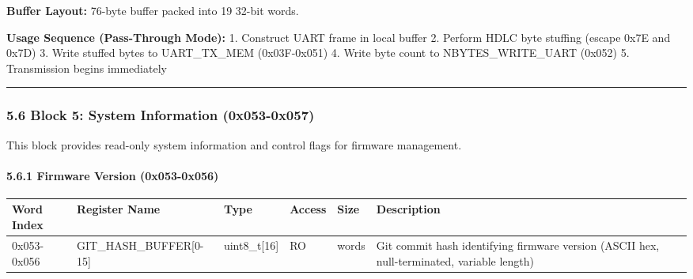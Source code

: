 \documentclass[
  11pt,
]{article}
\newcounter{none} %
\begin{document}
\textbf{Buffer Layout:} 76-byte buffer packed into 19 32-bit words.

\textbf{Usage Sequence (Pass-Through Mode):} 1. Construct UART frame in
local buffer 2. Perform HDLC byte stuffing (escape 0x7E and 0x7D) 3.
Write stuffed bytes to UART\_TX\_MEM (0x03F-0x051) 4. Write byte count
to NBYTES\_WRITE\_UART (0x052) 5. Transmission begins immediately

\begin{center}\rule{0.5\linewidth}{0.5pt}\end{center}

\subsubsection{5.6 Block 5: System Information
(0x053-0x057)}\label{block-5-system-information-0x053-0x057}

This block provides read-only system information and control flags for
firmware management.

\paragraph{5.6.1 Firmware Version
(0x053-0x056)}\label{firmware-version-0x053-0x056}

{\def\LTcaptype{none} %
\begin{longtable}[]{@{}
  >{\raggedright\arraybackslash}p{}
  >{\raggedright\arraybackslash}p{}
  >{\raggedright\arraybackslash}p{}
  >{\raggedright\arraybackslash}p{}
  >{\raggedright\arraybackslash}p{}
  >{\raggedright\arraybackslash}p{}@{}}
\toprule\noalign{}
\begin{minipage}[b]{\linewidth}\raggedright
Word Index
\end{minipage} & \begin{minipage}[b]{\linewidth}\raggedright
Register Name
\end{minipage} & \begin{minipage}[b]{\linewidth}\raggedright
Type
\end{minipage} & \begin{minipage}[b]{\linewidth}\raggedright
Access
\end{minipage} & \begin{minipage}[b]{\linewidth}\raggedright
Size
\end{minipage} & \begin{minipage}[b]{\linewidth}\raggedright
Description
\end{minipage} \\
\midrule\noalign{}
\endhead
\bottomrule\noalign{}
\endlastfoot
0x053-0x056 & GIT\_HASH\_BUFFER{[}0-15{]} & uint8\_t{[}16{]} & RO & 4
words & Git commit hash identifying firmware version (ASCII hex,
null-terminated, variable length) \\
\end{longtable}
}
\end{document}
